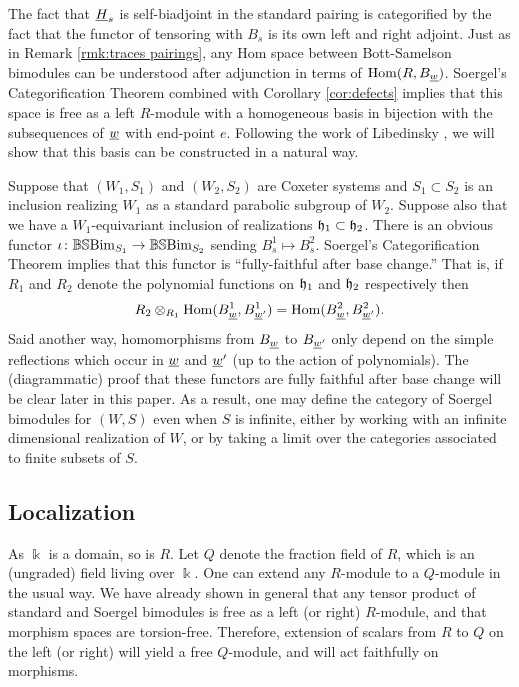 The fact that $\underline{H}_s$ is self-biadjoint in the standard pairing is categorified by the fact that the functor of tensoring with $B_s$ is its own left and right adjoint. Just as in Remark \ref{rmk:traces pairings}, any Hom space between Bott-Samelson bimodules can be understood after adjunction in terms of $\operatorname{Hom}(R,B_{\underline{w}})$. Soergel's Categorification Theorem
combined with Corollary \ref{cor:defects} implies that this space is free as a left $R$-module with a homogeneous basis in bijection with the subsequences of $\underline{w}$ with end-point $e$.
Following the work of Libedinsky \cite{Lib}, we will show that this basis can be constructed in a natural way.

\begin{remark} Suppose that $(W_1, S_1)$ and $(W_2, S_2)$ are Coxeter systems and $S_1 \subset S_2$ is an inclusion realizing $W_1$ as a standard parabolic subgroup of $W_2$. Suppose also
that we have a $W_1$-equivariant inclusion of realizations ${\mathfrak h}_1 \subset {\mathfrak h}_2$. There is an obvious functor $\iota \colon \mathbb{BS}\textrm{Bim}_{S_1} \rightarrow \mathbb{BS}\textrm{Bim}_{S_2}$ sending $B^1_s \mapsto B^2_s$.
Soergel's Categorification Theorem implies that this functor is ``fully-faithful after base change.'' That is, if $R_1$ and $R_2$ denote the polynomial functions on ${\mathfrak h}_1$ and ${\mathfrak h}_2$
respectively then \[ R_2 \otimes_{R_1} \operatorname{Hom}(B^1_{\underline{w}},B^1_{\underline{w}'}) = \operatorname{Hom}(B^2_{\underline{w}}, B^2_{\underline{w}'}). \] Said another way, homomorphisms from $B_{\underline{w}}$ to $B_{\underline{w}'}$ only
depend on the simple reflections which occur in $\underline{w}$ and $\underline{w}'$ (up to the action of polynomials). The (diagrammatic) proof that these functors are fully faithful after base change
will be clear later in this paper. As a result, one may define the category of Soergel bimodules for $(W, S)$ even when $S$ is infinite, either by working with an infinite dimensional
realization of $W$, or by taking a limit over the categories associated to finite subsets of $S$.\label{includingindexsets} \end{remark}

\subsection{Localization}

As $\Bbbk$ is a domain, so is $R$. Let $Q$ denote the fraction field of $R$, which is an (ungraded) field living over $\Bbbk$. One can extend any $R$-module to a $Q$-module in the usual
way. We have already shown in general that any tensor product of standard and Soergel bimodules is free as a left (or right) $R$-module, and that morphism spaces are torsion-free.
Therefore, extension of scalars from $R$ to $Q$ on the left (or right) will yield a free $Q$-module, and will act faithfully on morphisms.

